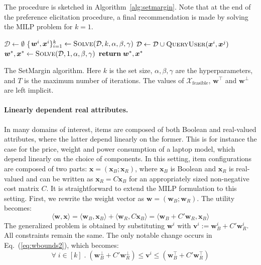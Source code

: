 \documentclass{article}
\renewcommand\[{\begin{equation}}
\renewcommand\]{\end{equation}}
\newcommand{\calvar}[1]{\ensuremath{\mathcal{#1}}}
\newcommand{\calD}{\calvar{D}}
\newcommand{\calX}{\calvar{X}}
\newcommand{\vecvar}[1]{\ensuremath{\boldsymbol{#1}}}
\newcommand{\vv}{\vecvar{v}}
\newcommand{\vw}{\vecvar{w}}
\newcommand{\vx}{\vecvar{x}}
\begin{document}
The procedure is sketched in
Algorithm~\ref{alg:setmargin}. Note that at the end of the preference
elicitation procedure, a final recommendation is made by solving the
MILP problem for $k=1$.

\begin{algorithm}[t]
{\footnotesize
\begin{algorithmic}[1]
        \State $\calD \gets \emptyset$
            \State \{$\vw^{i}, \vx^{i}\}_{i=1}^k \gets \text{{\sc Solve}}(\calD, k, \alpha, \beta, \gamma)$
            \For{$\vx^{i},\vx^{j} \in \{ \vx^{1}, \ldots, \vx^{k} \} \; \text{{\bf s.t.}} \; i < j$}
                \State $\calD \gets \calD \cup \text{{\sc QueryUser}}(\vx^{i},\vx^{j})$
            \EndFor
        \EndFor
        \State $\vw^*, \vx^* \gets \text{{\sc Solve}}(\calD, 1, \alpha, \beta, \gamma)$
        \State ${\bf return}\; \vw^*, \vx^*$
    \EndProcedure
\end{algorithmic}
}
\caption{\label{alg:setmargin} The {\sc SetMargin} algorithm. Here $k$ is the
set size, $\alpha,\beta,\gamma$ are the hyperparameters, and $T$ is the maximum
number of iterations. The values of $\calX_\text{feasible}$, $\vw^\top$ and
$\vw^\bot$ are left implicit.}
\end{algorithm}

\paragraph{Linearly dependent real attributes.} In many domains of
interest, items are composed of both Boolean and real-valued
attributes, where the latter depend linearly on the former. This is
for instance the case for the price, weight and power consumption of a
laptop model, which depend linearly on the choice of components.  In
this setting, item configurations are composed of two parts:
$\vx = (\vx_B;\vx_R)$, where $\vx_B$ is Boolean and $\vx_R$ is
real-valued and can be written as $\vx_R = C \vx_B$ for an
appropriately sized non-negative cost matrix $C$.  It is
straightforward to extend the MILP formulation to this setting. First,
we rewrite the weight vector as $\vw = (\vw_B;\vw_R)$. The utility
becomes:
%
$$ \langle \vw, \vx \rangle = \langle \vw_B, \vx_B \rangle + \langle \vw_R, C \vx_B \rangle = \langle \vw_B + C' \vw_R, \vx_B \rangle $$
%
The generalized problem is obtained by substituting $\vw^i$ with $\vv^i :=
\vw_B^i + C' \vw_R^i$.  All constraints remain the same. The only notable
change occurs in Eq.~(\ref{eq:wbounds2}), which becomes:
%
$$ \forall \; i \in [k] \;.\; (\vw_B^\bot + C' \vw_R^\bot) \le \vv^i \le (\vw_B^\top + C' \vw_R^\top)$$
%
\end{document}
